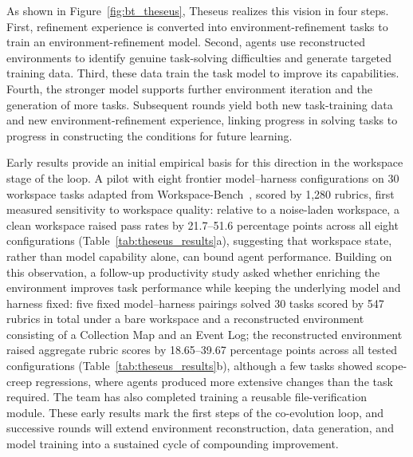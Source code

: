 {As shown in Figure~\ref{fig:bt_theseus}, Theseus realizes this vision in four steps. First, refinement experience is converted into environment-refinement tasks to train an environment-refinement model. Second, agents use reconstructed environments to identify genuine task-solving difficulties and generate targeted training data. Third, these data train the task model to improve its capabilities. Fourth, the stronger model supports further environment iteration and the generation of more tasks. Subsequent rounds yield both new task-training data and new environment-refinement experience, linking progress in solving tasks to progress in constructing the conditions for future learning.} %

{Early results provide an initial empirical basis for this direction in the workspace stage of the loop. A pilot with eight frontier model--harness configurations on 30 workspace tasks adapted from Workspace-Bench~\cite{tang2026workspacebench}, scored by 1,280 rubrics, first measured sensitivity to workspace quality: relative to a noise-laden workspace, a clean workspace raised pass rates by 21.7--51.6 percentage points across all eight configurations (Table~\ref{tab:theseus_results}a), suggesting that workspace state, rather than model capability alone, can bound agent performance. Building on this observation, a follow-up productivity study asked whether enriching the environment improves task performance while keeping the underlying model and harness fixed: five fixed model--harness pairings solved 30 tasks scored by 547 rubrics in total under a bare workspace and a reconstructed environment consisting of a Collection Map and an Event Log; the reconstructed environment raised aggregate rubric scores by 18.65--39.67 percentage points across all tested configurations (Table~\ref{tab:theseus_results}b), although a few tasks showed scope-creep regressions, where agents produced more extensive changes than the task required. The team has also completed training a reusable file-verification module. These early results mark the first steps of the co-evolution loop, and successive rounds will extend environment reconstruction, data generation, and model training into a sustained cycle of compounding improvement.}

